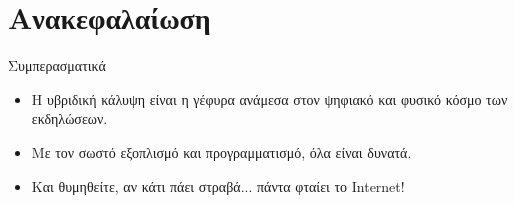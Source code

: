 \documentclass[aspectratio=169]{beamer}
\begin{document}
\section{Ανακεφαλαίωση}
\begin{frame}{Συμπερασματικά}
  \begin{itemize}
  \item Η υβριδική κάλυψη είναι η γέφυρα ανάμεσα στον ψηφιακό και φυσικό κόσμο των εκδηλώσεων.
  \item Με τον σωστό εξοπλισμό και προγραμματισμό, όλα είναι δυνατά.
  \item Και θυμηθείτε, αν κάτι πάει στραβά... πάντα φταίει το Internet!
  \end{itemize}
\end{frame}
\end{document}
